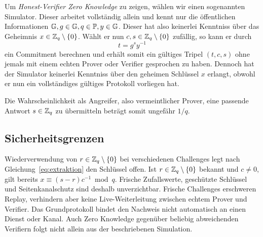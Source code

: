 
Um \emph{Honest-Verifier Zero Knowledge} zu zeigen, wählen wir einen sogenannten Simulator.
Dieser arbeitet vollständig allein und kennt nur die öffentlichen Informationen $\mathbb{G}, g\in \mathbb{G}, q \in \mathbb P, y\in \mathbb{G}$. 
Dieser hat also keinerlei Kenntniss über das Geheimnis $x \in \mathbb{Z}_q\setminus\{0\}$. 
Wählt er nun $c, s \in \mathbb{Z}_q\setminus\{0\}$ zufällig, so kann er durch 
\[
    t = g^s y^{-1}
\]
ein Commitment berechnen und erhält somit ein gültiges Tripel $(t,c,s)$ ohne jemals mit einem echten Prover oder Verifier gesprochen zu haben.
Dennoch hat der Simulator keinerlei Kenntniss über den geheimen Schlüssel $x$ erlangt, obwohl er nun ein vollständiges gültiges Protokoll vorliegen hat. 

Die Wahrscheinlichkeit als Angreifer, also vermeintlicher Prover, eine passende Antwort $s  \in \mathbb{Z}_q$ zu übermitteln beträgt somit ungefähr $1/q$. 

\subsection{Sicherheitsgrenzen}
Wiederverwendung von $r \in \mathbb{Z}_q\setminus\{0\} $ bei verschiedenen Challenges legt nach Gleichung~\eqref{eq:extraktion} den Schlüssel offen. 
Ist $r  \in \mathbb{Z}_q\setminus\{0\} $ bekannt und $c\neq0$, gilt bereits $x\equiv(s-r)c^{-1}\bmod q$. 
Frische Zufallswerte, geschützte Schlüssel und Seitenkanalschutz sind deshalb unverzichtbar. 
Frische Challenges erschweren Replay, verhindern aber keine Live-Weiterleitung zwischen echtem Prover und Verifier. 
Das Grundprotokoll bindet den Nachweis nicht automatisch an einen Dienst oder Kanal. 
Auch Zero Knowledge gegenüber beliebig abweichenden Verifiern folgt nicht allein aus der beschriebenen Simulation.
